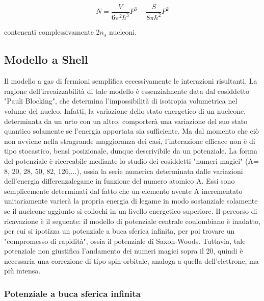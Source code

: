 \documentclass{article}
\begin{document}
\begin{equation}
    N= \frac{V}{6\pi^2 \hbar^3}P^3 - \frac{S}{8\pi\hbar^2}P^2
\end{equation}

contenenti complessivamente 2$n_s$ nucleoni.

\subsection{Modello a Shell}
Il modello a gas di fermioni semplifica eccessivamente le interazioni risultanti.
La ragione dell'irreaizzabilità di tale modello è essenzialmente data dal cosiddetto "Pauli Blocking", che determina
l'impossibilità di isotropia volumetrica nel volume del nucleo.
Infatti, la variazione dello stato energetico di un nucleone, determinata da un urto con un altro,
comporterà una variazione del suo stato quantico solamente se l'energia apportata sia sufficiente.
Ma dal momento che ciò non avviene nella stragrande maggioranza dei casi, l'interazione efficace non è di tipo
stocastico, bensì posizionale, dunque descrivibile da un potenziale.
La forma del potenziale è ricercabile mediante lo studio dei cosiddetti "numeri magici" (A= 8, 20, 28, 50, 82, 126,...), ossia la serie numerica determinata dalle variazioni dell'energia differenzalegame in funzione del numero atomico A.
Essi sono semplicemente determinati dal fatto che un elemento avente A incrementato unitariamente varierà la propria energia di legame in modo sostanziale solamente se il nucleone aggiunto si collochi in un livello energetico superiore.
Il percorso di ricavazione è il seguente: il modello di potenziale centrale coulombiano è inadatto, per cui si ipotizza un potenziale a buca sferica infinita, per poi trovare un "compromesso di rapidità", ossia il potenziale di Saxon-Woods.
Tuttavia, tale potenziale non giustifica l'andamento dei numeri magici sopra il 20, quindi è necessaria una correzione di tipo spin-orbitale, analoga a quella dell'elettrone, ma più intensa.

\subsubsection{Potenziale a buca sferica infinita}
\end{document}
